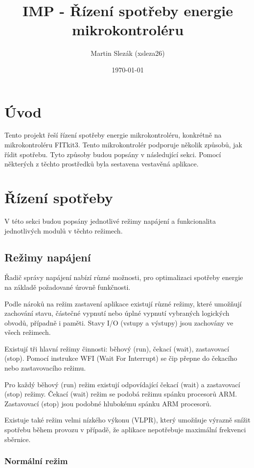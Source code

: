 \documentclass{article}
\title{IMP - Řízení spotřeby energie mikrokontroléru}
\author{Martin Slezák (xsleza26)}
\date{\today}
\begin{document}
\maketitle

\section{Úvod}

Tento projekt řeší řízení spotřeby energie mikrokontroléru, konkrétně na
mikrokontroléru FITkit3. Tento mikrokontrolér podporuje několik způsobů, jak
řídit spotřebu. Tyto způsoby budou popsány v následující sekci. Pomocí
některých z těchto prostředků byla sestavena vestavěná aplikace.

\section{Řízení spotřeby}

V této sekci budou popsány jednotlivé režimy napájení a funkcionalita
jednotlivých modulů v těchto režimech.

\subsection{Režimy napájení}

Řadič správy napájení nabízí různé možnosti, pro optimalizaci spotřeby energie
na základě požadované úrovně funkčnosti.

Podle nároků na režim zastavení aplikace existují různé režimy, které umožňují
zachování stavu, částečné vypnutí nebo úplné vypnutí vybraných logických
obvodů, případně i paměti. Stavy I/O (vstupy a výstupy) jsou zachovány ve všech
režimech.

Existují tři hlavní režimy činnosti: běhový (run), čekací (wait), zastavovací
(stop). Pomocí instrukce WFI (Wait For Interrupt) se čip přepne do čekacího
nebo zastavovacího režimu.

Pro každý běhový (run) režim existují odpovídající čekací (wait) a zastavovací
(stop) režimy. Čekací (wait) režim se podobá režimu spánku procesorů ARM.
Zastavovací (stop) jsou podobné hlubokému spánku ARM procesorů.

Existuje také režim velmi nízkého výkonu (VLPR), který umožňuje výrazně snížit
spotřebu během provozu v případě, že aplikace nepotřebuje maximální frekvenci
sběrnice.

\subsubsection{Normální režim}
\end{document}
